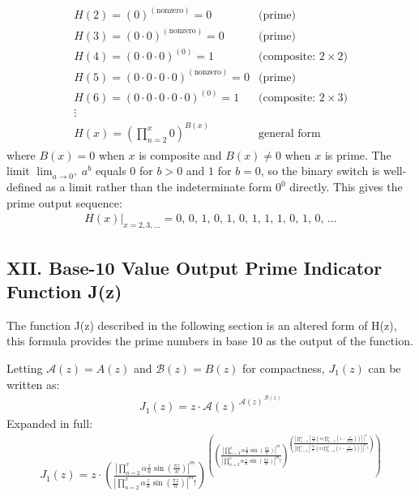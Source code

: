 \documentclass{article}
\begin{document}
\begin{align*}
\begin{array}{ll}
H(2) = (0)^{(\text{nonzero})} = 0 & \text{(prime)} \\[4pt]
H(3) = (0 \cdot 0)^{(\text{nonzero})} = 0 & \text{(prime)} \\[4pt]
H(4) = (0 \cdot 0 \cdot 0)^{(0)} = 1 & \text{(composite: } 2\times 2\text{)} \\[4pt]
H(5) = (0 \cdot 0 \cdot 0 \cdot 0)^{(\text{nonzero})} = 0 & \text{(prime)} \\[4pt]
H(6) = (0 \cdot 0 \cdot 0 \cdot 0 \cdot 0)^{(0)} = 1 & \text{(composite: } 2\times 3\text{)} \\[4pt]
\vdots & \\[4pt]
H(x) = \left(\prod_{n=2}^x 0\right)^{B(x)} & \text{general form}
\end{array}
\end{align*}
where $B(x) = 0$ when $x$ is composite and $B(x) \neq 0$ when $x$ is prime. The limit $\lim_{a\to 0^+} a^{b}$ equals $0$ for $b > 0$ and $1$ for $b = 0$, so the binary switch is well-defined as a limit rather than the indeterminate form $0^0$ directly. This gives the prime output sequence:
\begin{align*}
H(x)\big|_{x=2,3,\ldots} = 0,\, 0,\, 1,\, 0,\, 1,\, 0,\, 1,\, 1,\, 1,\, 0,\, 1,\, 0,\, \ldots
\end{align*}

\newpage
\newpage
\subsection{XII. Base-10 Value Output Prime Indicator Function J(z)}
The function J(z) described in the following section is an altered form of H(z), this formula provides the prime numbers in base 10 as the output of the function.

Letting $\mathcal{A}(z) = A(z)$ and $\mathcal{B}(z) = B(z)$ for compactness, $J_1(z)$ can be written as:
\begin{align*}
J_{1}(z) = z \cdot \mathcal{A}(z)^{\,\mathcal{A}(z)^{\,\mathcal{B}(z)}}
\end{align*}
Expanded in full:
\begin{align*}
J_{1}(z) = z \cdot \left(\frac{|\prod_{n=2}^x \alpha\frac{z}{n}\sin\left(\frac{\pi z}{n}\right)|^{m}}{|\prod_{n=2}^x \alpha\frac{z}{n}\sin\left(\frac{\pi z}{n}\right)|^{m}!}\right)^{\left(\left(\frac{|\prod_{n=2}^x \alpha\frac{z}{n}\sin\left(\frac{\pi z}{n}\right)|^{m}}{|\prod_{n=2}^x \alpha\frac{z}{n}\sin\left(\frac{\pi z}{n}\right)|^{m}!}\right)^{\left(\frac{|\prod_{n=2}^x\left[\frac{\beta z}{n}\left({\pi z}\prod_{k=2}^z\left(1 - \frac{z^2}{k^2n^2}\right)\right)\right]|^{m}}{|\prod_{n=2}^x\left[\frac{\beta z}{n}\left({\pi z}\prod_{k=2}^z\left(1 - \frac{z^2}{k^2n^2}\right)\right)\right]|^{m}!}\right)}\right)}
\end{align*}
\end{document}
